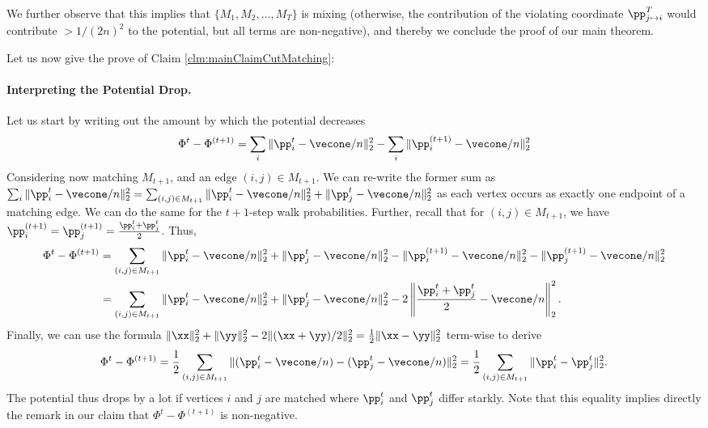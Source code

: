 We further observe that this implies that $\{M_1, M_2, \dots, M_{T}\}$ is mixing (otherwise, the contribution of the violating coordinate $\pp^T_{j \mapsto i}$ would contribute $>1/(2n)^2$ to the potential, but all terms are non-negative), and thereby we conclude the proof of our main theorem. 

Let us now give the prove of Claim \ref{clm:mainClaimCutMatching}: 

\paragraph{Interpreting the Potential Drop.} Let us start by writing out the amount by which the potential decreases 
\begin{align*}
     \Phi^{t} - \Phi^{(t+1)} = \sum_{i} \|\pp_{i}^t -\vecone/n\|_2^2 - \sum_{i} \|\pp_{i}^{(t+1)} -\vecone/n\|_2^2
\end{align*}
Considering now matching $M_{t+1}$,  and an edge $(i,j) \in M_{t+1}$. We can re-write the former sum as $\sum_{i} \|\pp_{i}^t -\vecone/n\|_2^2 = \sum_{(i,j) \in M_{t+1}} \|\pp_{i}^t -\vecone/n\|_2^2 + \|\pp_{j}^t -\vecone/n\|_2^2$ as each vertex occurs as exactly one endpoint of a matching edge. We can do the same for the $t+1$-step walk probabilities. Further, recall that for $(i,j) \in M_{t+1}$, we have $\pp_i^{(t+1)} = \pp_j^{(t+1)} = \frac{\pp_i^t+ \pp_j^t}{2}$. Thus,
\begin{align*}
     \Phi^{t} - \Phi^{(t+1)} &= \sum_{(i,j) \in M_{t+1}}  \|\pp_{i}^t -\vecone/n\|_2^2 + \|\pp_{j}^t -\vecone/n\|_2^2 -  \|\pp_{i}^{(t+1)} -\vecone/n\|_2^2 - \|\pp_{j}^{(t+1)} -\vecone/n\|_2^2\\
     &= \sum_{(i,j)\in M_{t+1}}  \|\pp_{i}^t -\vecone/n\|_2^2 + \|\pp_{j}^t -\vecone/n\|_2^2 - 2 \left\|\frac{\pp_i^t+ \pp_j^t}{2} - \vecone/n \right\|_2^2.
\end{align*}
Finally, we can use the formula $\|\xx\|_2^2 + \|\yy\|_2^2 - 2 \|(\xx + \yy)/2\|_2^2 = \frac{1}{2} \| \xx - \yy\|_2^2$ term-wise to derive 
\begin{align*}
     \Phi^{t} - \Phi^{(t+1)} = \frac{1}{2}\sum_{(i,j) \in M_{t+1}} \|(\pp_{i}^t -\vecone/n) - (\pp_{j}^t -\vecone/n)\|_2^2 = \frac{1}{2}\sum_{(i,j) \in M_{t+1}} \|\pp_{i}^t - \pp_{j}^t \|_2^2.
\end{align*}
The potential thus drops by a lot if vertices $i$ and $j$ are matched where $\pp_{i}^t$ and $\pp_{j}^t$ differ starkly. Note that this equality implies directly the remark in our claim that $\Phi^t - \Phi^{(t+1)}$ is non-negative.

